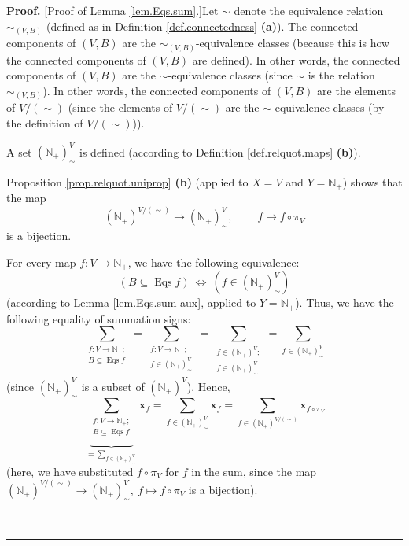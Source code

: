 \documentclass[numbers=enddot,12pt,final,onecolumn,notitlepage]{scrartcl}%
\theoremstyle{definition}
\newenvironment{proof}[1][Proof]{\noindent\textbf{#1.} }{\ \rule{0.5em}{0.5em}}
\newenvironment{verlong}{}{}
\let\sumnonlimits\sum
\renewcommand{\sum}{\sumnonlimits\limits}
\begin{document}
\begin{verlong}
\begin{proof}
[Proof of Lemma \ref{lem.Eqs.sum}.]Let $\sim$ denote the equivalence relation
$\sim_{\left(  V,B\right)  }$ (defined as in Definition
\ref{def.connectedness} \textbf{(a)}). The connected components of $\left(
V,B\right)  $ are the $\sim_{\left(  V,B\right)  }$-equivalence classes
(because this is how the connected components of $\left(  V,B\right)  $ are
defined). In other words, the connected components of $\left(  V,B\right)  $
are the $\sim$-equivalence classes (since $\sim$ is the relation
$\sim_{\left(  V,B\right)  }$). In other words, the connected components of
$\left(  V,B\right)  $ are the elements of $V/\left(  \sim\right)  $ (since
the elements of $V/\left(  \sim\right)  $ are the $\sim$-equivalence classes
(by the definition of $V/\left(  \sim\right)  $)).

A set $\left(  \mathbb{N}_{+}\right)  _{\sim}^{V}$ is defined (according to
Definition \ref{def.relquot.maps} \textbf{(b)}).

Proposition \ref{prop.relquot.uniprop} \textbf{(b)} (applied to $X=V$ and
$Y=\mathbb{N}_{+}$) shows that the map%
\[
\left(  \mathbb{N}_{+}\right)  ^{V/\left(  \sim\right)  }\rightarrow\left(
\mathbb{N}_{+}\right)  _{\sim}^{V},\ \ \ \ \ \ \ \ \ \ f\mapsto f\circ\pi_{V}%
\]
is a bijection.

For every map $f:V\rightarrow\mathbb{N}_{+}$, we have the following
equivalence:%
\begin{equation}
\left(  B\subseteq\operatorname*{Eqs}f\right)  \ \Longleftrightarrow\ \left(
f\in\left(  \mathbb{N}_{+}\right)  _{\sim}^{V}\right)
\label{pf.lem.Eqs.sum.equivalence}%
\end{equation}
(according to Lemma \ref{lem.Eqs.sum-aux}, applied to $Y=\mathbb{N}_{+}$).
Thus, we have the following equality of summation signs:
\[
\sum_{\substack{f:V\rightarrow\mathbb{N}_{+};\\B\subseteq\operatorname*{Eqs}%
f}}=\sum_{\substack{f:V\rightarrow\mathbb{N}_{+};\\f\in\left(  \mathbb{N}%
_{+}\right)  _{\sim}^{V}}}=\sum_{\substack{f\in\left(  \mathbb{N}_{+}\right)
^{V};\\f\in\left(  \mathbb{N}_{+}\right)  _{\sim}^{V}}}=\sum_{f\in\left(
\mathbb{N}_{+}\right)  _{\sim}^{V}}%
\]
(since $\left(  \mathbb{N}_{+}\right)  _{\sim}^{V}$ is a subset of $\left(
\mathbb{N}_{+}\right)  ^{V}$). Hence,%
\begin{equation}
\underbrace{\sum_{\substack{f:V\rightarrow\mathbb{N}_{+};\\B\subseteq
\operatorname*{Eqs}f}}}_{=\sum_{f\in\left(  \mathbb{N}_{+}\right)  _{\sim}%
^{V}}}\mathbf{x}_{f}=\sum_{f\in\left(  \mathbb{N}_{+}\right)  _{\sim}^{V}%
}\mathbf{x}_{f}=\sum_{f\in\left(  \mathbb{N}_{+}\right)  ^{V/\left(
\sim\right)  }}\mathbf{x}_{f\circ\pi_{V}} \label{pf.lem.Eqs.sum.1}%
\end{equation}
(here, we have substituted $f\circ\pi_{V}$ for $f$ in the sum, since the map
$\left(  \mathbb{N}_{+}\right)  ^{V/\left(  \sim\right)  }\rightarrow\left(
\mathbb{N}_{+}\right)  _{\sim}^{V},\ f\mapsto f\circ\pi_{V}$ is a bijection).


\end{proof}
\end{verlong}
\end{document}

